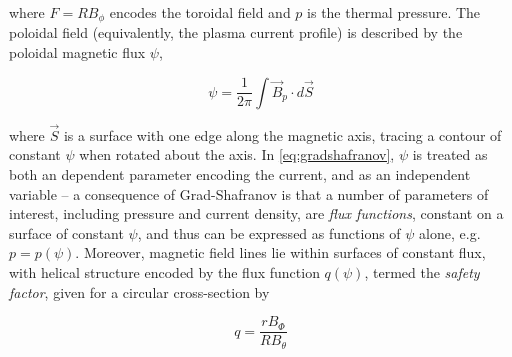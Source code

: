 \noindent where $F = RB_\phi$ encodes the toroidal field and $p$ is the thermal pressure.  The poloidal field (equivalently, the plasma current profile) is described by the poloidal magnetic flux $\psi$,

\begin{equation}\label{eq:psi}
 \psi = \frac{1}{2\pi} \int \vec{B}_p \cdot d\vec{S}
\end{equation}

\noindent where $\vec{S}$ is a surface with one edge along the magnetic axis, tracing a contour of constant $\psi$ when rotated about the axis.  In \cref{eq:gradshafranov}, $\psi$ is treated as both an dependent parameter encoding the current, and as an independent variable -- a consequence of Grad-Shafranov is that a number of parameters of interest, including pressure and current density, are \emph{flux functions}, constant on a surface of constant $\psi$, and thus can be expressed as functions of $\psi$ alone, e.g. $p = p(\psi)$.  Moreover, magnetic field lines lie within surfaces of constant flux, with helical structure encoded by the flux function $q(\psi)$, termed the \emph{safety factor}, given for a circular cross-section by

\begin{equation}\label{eq:q}
 q = \frac{rB_\Phi}{RB_\theta}
\end{equation}

\begin{figure}
 \pushtooutside
\end{figure}


